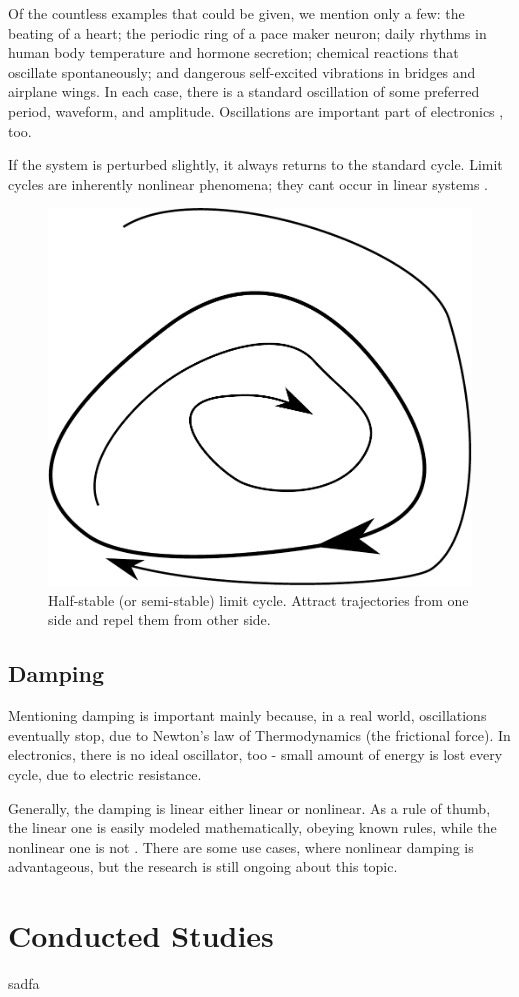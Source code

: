 \documentclass[journal]{IEEEtran}
\begin{document}
Of the countless examples that could be given, we mention only a few: the beating of a heart; the periodic ring of a pace maker neuron; daily rhythms in human body temperature and hormone secretion; chemical reactions that oscillate spontaneously; and dangerous self-excited vibrations in bridges and airplane wings. In each case, there is a standard oscillation of some preferred period, waveform, and amplitude. Oscillations are important part of electronics \cite{oscillations}, too.

If the system is perturbed slightly, it always returns to the standard cycle. Limit cycles are inherently nonlinear phenomena; they cant occur in linear systems \cite{strogatz2008nonlinear}.

\begin{figure}[ht!]
	\centering
	\includegraphics[width=.5\linewidth]{lcycle_hstable}
	\caption{Half-stable (or semi-stable) limit cycle. Attract trajectories from one side and repel them from other side.}
	\label{f:lc_hst}
\end{figure}

\subsection{Damping}
Mentioning damping is important mainly because, in a real world, oscillations eventually stop, due to Newton's law of Thermodynamics (the frictional force). In electronics, there is no ideal oscillator, too - small amount of energy is lost every cycle, due to electric resistance.

Generally, the damping is linear either linear or nonlinear. As a rule of thumb, the linear one is easily modeled mathematically, obeying known rules, while the nonlinear one is not \cite{institute1989estimation}. There are some use cases, where nonlinear damping is advantageous, but the research is still ongoing about this topic.

\section{Conducted Studies}
sadfa
\end{document}
